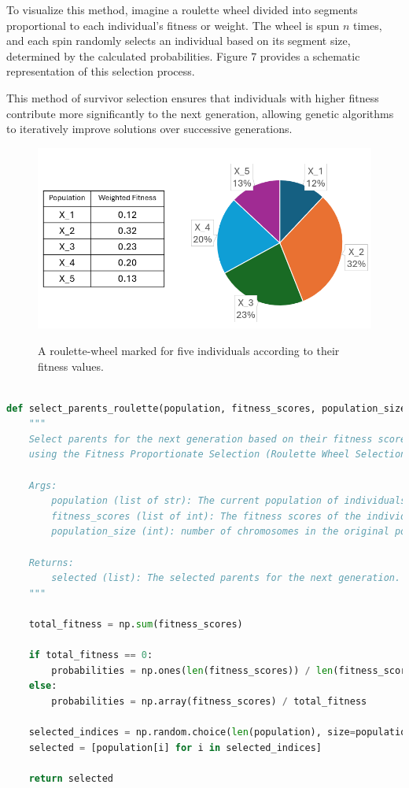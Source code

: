 \documentclass[12pt]{article}
\begin{document}
To visualize this method, imagine a roulette wheel divided into segments proportional to each individual's fitness or weight. The wheel is spun $n$ times, and each spin randomly selects an individual based on its segment size, determined by the calculated probabilities. Figure 7 provides a schematic representation of this selection process.

This method of survivor selection ensures that individuals with higher fitness contribute more significantly to the next generation, allowing genetic algorithms to iteratively improve solutions over successive generations.


\begin{figure}[H]
\centering
\includegraphics[scale=1]{Picture6}\\
\caption{A roulette-wheel marked for five individuals according to their fitness values.}
\end{figure}


\begin{lstlisting}[language=Python, caption={Roulette Wheel Selection}, numbers=none, breaklines=true]

def select_parents_roulette(population, fitness_scores, population_size):
    """
    Select parents for the next generation based on their fitness scores
    using the Fitness Proportionate Selection (Roulette Wheel Selection) method.

    Args:
        population (list of str): The current population of individuals, each represented as a binary string.
        fitness_scores (list of int): The fitness scores of the individuals in the population.
        population_size (int): number of chromosomes in the original population

    Returns:
        selected (list): The selected parents for the next generation.
    """

    total_fitness = np.sum(fitness_scores)

    if total_fitness == 0:
        probabilities = np.ones(len(fitness_scores)) / len(fitness_scores)
    else:
        probabilities = np.array(fitness_scores) / total_fitness

    selected_indices = np.random.choice(len(population), size=population_size, p=probabilities)
    selected = [population[i] for i in selected_indices]

    return selected 
    
\end{lstlisting}
\end{document}
